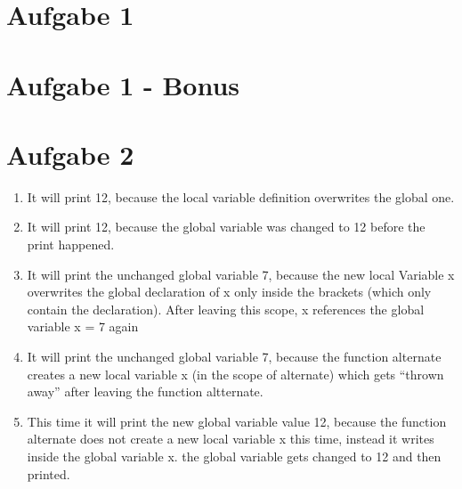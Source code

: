 \documentclass[12pt]{article}
\begin{document}
\lstset{language=C}

\section{Aufgabe 1}


\section{Aufgabe 1 - Bonus}


\section{Aufgabe 2}
\begin{enumerate}[1)]
    \item 
        It will print 12, because the local variable definition overwrites the global one.
    \item
        It will print 12, because the global variable was changed to 12 before the print happened.
    \item
        It will print the unchanged global variable 7, because the new local Variable x overwrites the global declaration of x only inside the brackets (which only contain the declaration). After leaving this scope, x references the global variable x = 7 again
    \item
        It will print the unchanged global variable 7, because the function alternate creates a new local variable x (in the scope of alternate) which gets ``thrown away'' after leaving the function altternate. 
    \item
        This time it will print the new global variable value 12, because the function alternate does not create a new local variable x this time, instead it writes inside the global variable x. the global variable gets changed to 12 and then printed.
\end{enumerate}
\end{document}

